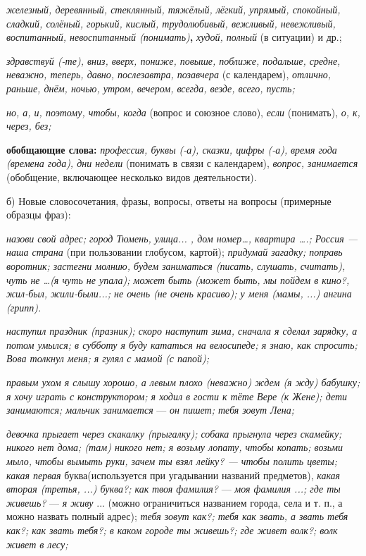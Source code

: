 \documentclass[a5paper]{book}
\renewcommand{\emph}[1]{\textit{#1}}
\begin{document}
\emph{железный, деревянный, стеклянный, тяжёлый, лёгкий, упрямый,
спокойный, сладкий, солёный, горький, кислый, трудолюбивый, вежливый,
невежливый, воспитанный, невоспитанный (понимать)}\textbf{,}
\emph{худой, полный} (в ситуации) и др.;

\emph{здравствуй (-те), вниз, вверх, пониже, повыше, поближе, подальше,
средне, неважно, теперь, давно, послезавтра, позавчера} (с календарем),
\emph{отлично, раньше, днём, ночью, утром, вечером, всегда, везде,
всего, пусть;}

\emph{но, а, и, поэтому, чтобы, когда} (вопрос и союзное слово),
\emph{если} (понимать), \emph{о, к, через, без;}

\textbf{обобщающие слова:} \emph{профессия, буквы (-а), сказки, цифры
(-а),} \emph{время года (времена года), дни недели} (понимать в связи с
календарем), \emph{вопрос, занимается} (обобщение, включающее несколько
видов деятельности).

б) Новые словосочетания, фразы, вопросы, ответы на вопросы (примерные
образцы фраз):

\emph{назови свой адрес; город Тюмень, улица... , дом номер\ldots,
квартира \ldots.; Россия --- наша страна} (при пользовании глобусом,
картой); \emph{придумай загадку; поправь воротник; застегни молнию,
будем заниматься (писать, слушать, считать), чуть не \ldots(я чуть не
упала); может быть (может быть, мы пойдем в кино?, жил-был,
жили-были...; не очень (не очень красиво); у меня (мамы, ...) ангина
(грипп).}

\emph{наступил праздник (празник); скоро наступит зима, сначала я сделал
зарядку, а потом умылся; в субботу я буду кататься на велосипеде; я
знаю, как спросить; Вова толкнул меня; я гулял с мамой} \emph{(с
папой);}

\emph{правым ухом я слышу хорошо, а левым плохо (неважно) ждем (я жду)
бабушку; я хочу играть с конструктором; я ходил в гости к тёте Вере (к
Жене); дети занимаются; мальчик занимается} --- \emph{он пишет; тебя
зовут Лена;}

\emph{девочка прыгает через скакалку (прыгалку); собака прыгнула через
скамейку; никого нет дома; (там) никого нет; я возьму лопату, чтобы
копать; возьми мыло, чтобы вымыть руки, зачем ты взял лейку? --- чтобы
полить цветы; какая первая} буква(используется при угадывании названий
предметов), \emph{какая вторая (третья, ...) буква?; как} \emph{твоя
фамилия?} --- \emph{моя фамилия ...; где ты живешь?} --- \emph{я живу}
... (можно ограничиться названием города, села и т. п., а можно назвать
полный адрес); \emph{тебя зовут как?; тебя как звать, а звать тебя как?;
как звать тебя?; в каком городе ты живешь?; где живет волк?; волк живет
в лесу;}
\end{document}
